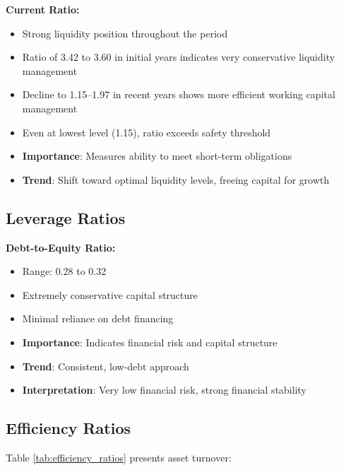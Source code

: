 \documentclass[8pt,a4paper]{article}
\begin{document}
\textbf{Current Ratio:}
\begin{itemize}
    \item Strong liquidity position throughout the period
    \item Ratio of 3.42 to 3.60 in initial years indicates very conservative liquidity management
    \item Decline to 1.15--1.97 in recent years shows more efficient working capital management
    \item Even at lowest level (1.15), ratio exceeds safety threshold
    \item \textbf{Importance}: Measures ability to meet short-term obligations
    \item \textbf{Trend}: Shift toward optimal liquidity levels, freeing capital for growth
\end{itemize}

\subsection{Leverage Ratios}

\textbf{Debt-to-Equity Ratio:}
\begin{itemize}
    \item Range: 0.28 to 0.32
    \item Extremely conservative capital structure
    \item Minimal reliance on debt financing
    \item \textbf{Importance}: Indicates financial risk and capital structure
    \item \textbf{Trend}: Consistent, low-debt approach
    \item \textbf{Interpretation}: Very low financial risk, strong financial stability
\end{itemize}

\subsection{Efficiency Ratios}

Table \ref{tab:efficiency_ratios} presents asset turnover:
\end{document}
